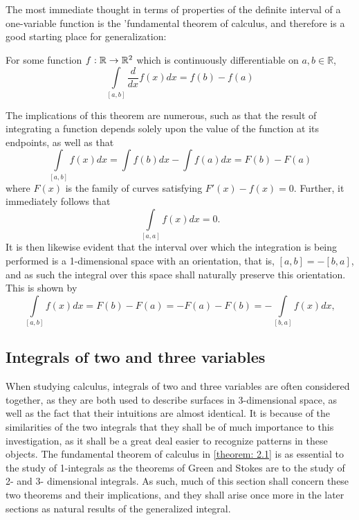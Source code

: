 \documentclass[.../main.tex]{subfiles}
\begin{document}
The most immediate thought in terms of properties of the definite interval of a one-variable function is the 'fundamental theorem of calculus\footnotemark, and therefore is a good starting place for generalization:
\begin{theorem}
	For some function $f:\mathbb{R}\rightarrow\mathbb{R}^{2}$ which is continuously differentiable on $a, b \in \mathbb{R}$, 
	\[
		\int\limits_{[a, b]}\frac{d}{dx} f(x)dx=f(b)-f(a) 
	\]
	\label{theorem: 2.1}
\end{theorem}
The implications of this theorem are numerous, such as that the result of integrating a function depends solely upon the value of the function at its endpoints, as well as that
\begin{equation}
	\int\limits_{[a, b]}f(x)dx = \int f(b) dx - \int f(a) dx = F(b)-F(a)
	\label{eq: 2.1}
\end{equation}
where $F(x)$ is the family of curves satisfying $F'(x)-f(x)=0$. Further, it immediately follows that 
\begin{equation}
	\int\limits_{[a, a]}f(x)dx = 0.
	\label{eq: 2.2}	
\end{equation} 
It is then likewise evident that the interval over which the integration is being performed is a 1-dimensional space with an orientation, that is, $[a, b]=-[b, a]$, and as such the integral over this space shall naturally preserve this orientation. This is shown by 
\begin{equation}
	\int\limits_{[a, b]} f(x)dx = F(b)-F(a) = -F(a)-F(b) = -\int\limits_{[b, a]}f(x)dx,
	\label{eq: 2.3}	
\end{equation}


\subsection{Integrals of two and three variables} \label{subsection: 2.2}
When studying calculus, integrals of two and three variables are often considered together, as they are both used to describe surfaces in 3-dimensional space, as well as the fact that their intuitions are almost identical. It is because of the similarities of the two integrals that they shall be of much importance to this investigation, as it shall be a great deal easier to recognize patterns in these objects. The fundamental theorem of calculus in \ref{theorem: 2.1} is as essential to the study of 1-integrals as the theorems of Green and Stokes are to the study of 2- and 3- dimensional integrals. As such, much of this section shall concern these two theorems and their implications, and they shall arise once more in the later sections as natural results of the generalized integral.
\end{document}
